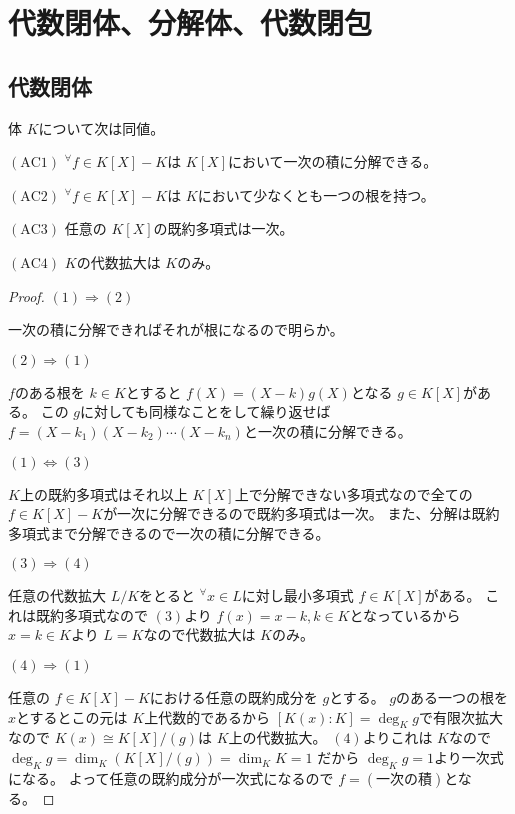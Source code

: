 \documentclass[../master_galois_theory]{subfiles}
\begin{document}
\setcounter{section}{6}

\section{代数閉体、分解体、代数閉包}

\subsection{代数閉体}

\begin{prop} \label{prop:7.1}
  体 $K$について次は同値。

  $(\mathrm{AC}1)$
    ${}^\forall f \in K[X] - K$は $K[X]$において一次の積に分解できる。

  $(\mathrm{AC}2)$
    ${}^\forall f \in K[X] - K$は $K$において少なくとも一つの根を持つ。

  $(\mathrm{AC}3)$
    任意の $K[X]$の既約多項式は一次。

  $(\mathrm{AC}4)$
    $K$の代数拡大は $K$のみ。
\end{prop}

\begin{proof}

  $(1) \Rightarrow (2)$

  一次の積に分解できればそれが根になるので明らか。

  $(2) \Rightarrow (1)$

  $f$のある根を $k \in K$とすると $f(X) = (X - k)g(X)$となる $g \in K[X]$がある。
  この $g$に対しても同様なことをして繰り返せば
  $f = (X - k_1)(X - k_2) \cdots (X - k_n)$と一次の積に分解できる。

  $(1) \Leftrightarrow (3)$

  $K$上の既約多項式はそれ以上 $K[X]$上で分解できない多項式なので全ての $f \in K[X] - K$が一次に分解できるので既約多項式は一次。
  また、分解は既約多項式まで分解できるので一次の積に分解できる。

  $(3) \Rightarrow (4)$

  任意の代数拡大 $L/K$をとると
  ${}^\forall x \in L$に対し最小多項式 $f \in K[X]$がある。
  これは既約多項式なので $(3)$より $f(x) = x - k , k \in K$となっているから
  $x = k \in K$より $L = K$なので代数拡大は $K$のみ。

  $(4) \Rightarrow (1)$

  任意の $f \in K[X] - K$における任意の既約成分を $g$とする。
  $g$のある一つの根を $x$とするとこの元は $K$上代数的であるから
  $[K(x):K] = \deg_K g$で有限次拡大なので
  $K(x) \cong K[X]/(g)$は $K$上の代数拡大。
  $(4)$よりこれは $K$なので $\deg_K g = \dim_K (K[X]/(g)) = \dim_K K = 1$
  だから $\deg_K g = 1$より一次式になる。
  よって任意の既約成分が一次式になるので $f = (一次の積)$となる。
\end{proof}
\end{document}
